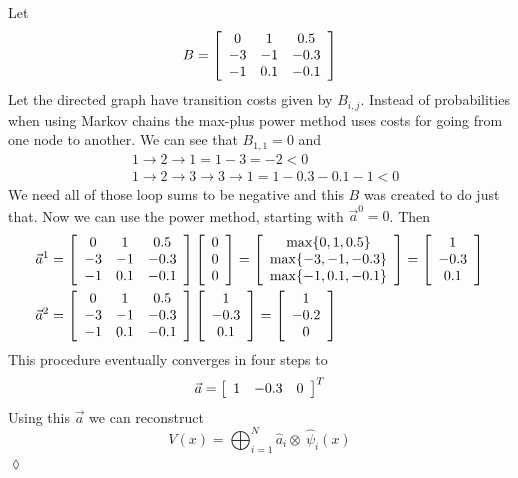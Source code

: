 \begin{example}
Let
$$B = \left[\begin{array}{c c c} 0 & 1 & 0.5 \\ -3 & -1 & -0.3 \\ -1 & 0.1 & -0.1 \end{array}\right]$$
Let the directed graph have transition costs given by $B_{i,j}$.
Instead of probabilities when using Markov chains the max-plus power method uses costs for going from one node to another.%
We can see that $B_{1,1}=0$ and
\begin{align*}
&1\to2\to1 = 1-3 = -2<0 \\
&1\to2\to3\to3\to1 = 1-0.3-0.1-1 < 0
\end{align*}
We need all of those loop sums to be negative and this $B$ was created to do just that.
Now we can use the power method, starting with $\vec{a}^0=0$.
Then
\begin{align*}
\vec{a}^1 &= \left[\begin{array}{c c c} 0 & 1 & 0.5 \\ -3 & -1 & -0.3 \\ -1 & 0.1 & -0.1 \end{array}\right] \left[\begin{array}{c} 0 \\ 0 \\ 0 \end{array}\right] = \left[\begin{array}{c} \max\{0,1,0.5\} \\ \max\{-3,-1,-0.3\} \\ \max\{-1,0.1,-0.1\} \end{array}\right] = \left[\begin{array}{c} 1 \\ -0.3 \\ 0.1 \end{array}\right] \\
\vec{a}^2 &= \left[\begin{array}{c c c} 0 & 1 & 0.5 \\ -3 & -1 & -0.3 \\ -1 & 0.1 & -0.1 \end{array}\right] \left[\begin{array}{c} 1 \\ -0.3 \\ 0.1 \end{array}\right] = \left[\begin{array}{c} 1 \\ -0.2 \\ 0 \end{array}\right]
\end{align*}
This procedure eventually converges in four steps to
$$\vec{a} = \left[\begin{array}{c c c} 1 & -0.3 & 0 \end{array}\right]^T$$
Using this $\vec{a}$ we can reconstruct
$$V (x) = \bigoplus_{i=1}^N\hat{a}_i\otimes~\hat{\psi}_i (x)$$
$\lozenge$
\end{example}%
